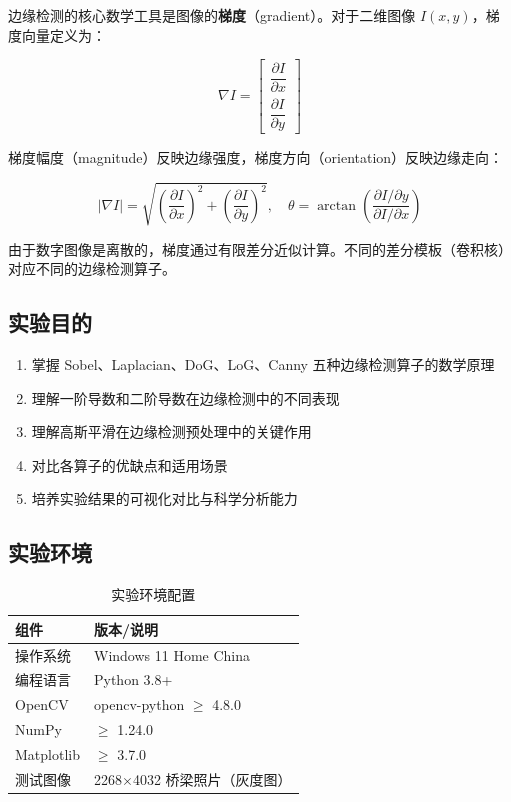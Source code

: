 \documentclass[12pt,a4paper]{ctexart}
\begin{document}
边缘检测的核心数学工具是图像的\textbf{梯度}（gradient）。对于二维图像 $I(x,y)$，梯度向量定义为：

\begin{equation}
    \nabla I = \begin{bmatrix}
        \dfrac{\partial I}{\partial x} \\[8pt]
        \dfrac{\partial I}{\partial y}
    \end{bmatrix}
    \label{eq:gradient}
\end{equation}

梯度幅度（magnitude）反映边缘强度，梯度方向（orientation）反映边缘走向：

\begin{equation}
    |\nabla I| = \sqrt{\left(\frac{\partial I}{\partial x}\right)^2 + \left(\frac{\partial I}{\partial y}\right)^2},
    \quad
    \theta = \arctan\left(\frac{\partial I/\partial y}{\partial I/\partial x}\right)
    \label{eq:magnitude}
\end{equation}

由于数字图像是离散的，梯度通过有限差分近似计算。不同的差分模板（卷积核）对应不同的边缘检测算子。

\subsection{实验目的}

\begin{enumerate}[leftmargin=*]
    \item 掌握 Sobel、Laplacian、DoG、LoG、Canny 五种边缘检测算子的数学原理
    \item 理解一阶导数和二阶导数在边缘检测中的不同表现
    \item 理解高斯平滑在边缘检测预处理中的关键作用
    \item 对比各算子的优缺点和适用场景
    \item 培养实验结果的可视化对比与科学分析能力
\end{enumerate}

\subsection{实验环境}

\begin{table}[H]
    \centering
    \caption{实验环境配置}
    \begin{tabular}{ll}
        \toprule
        \textbf{组件} & \textbf{版本/说明} \\
        \midrule
        操作系统 & Windows 11 Home China \\
        编程语言 & Python 3.8+ \\
        OpenCV & opencv-python $\ge$ 4.8.0 \\
        NumPy & $\ge$ 1.24.0 \\
        Matplotlib & $\ge$ 3.7.0 \\
        测试图像 & 2268$\times$4032 桥梁照片（灰度图） \\
        \bottomrule
    \end{tabular}
\end{table}
\end{document}
